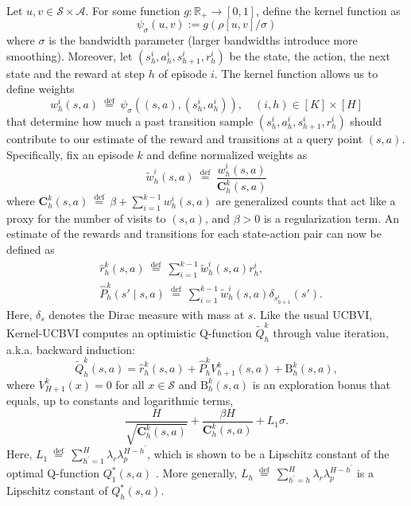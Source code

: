 \documentclass{article}
\numberwithin{equation}{section}
\newcommand{\cS}{\mathcal{S}}
\begin{document}
Let $u, v \in \cS \times \mathcal{A}$. For some function $g: \mathbb{R}_{+} \rightarrow[0,1]$, define the kernel function as
$$
\psi_\sigma(u, v) := g(\rho[u, v] / \sigma)
$$
where $\sigma$ is the bandwidth parameter (larger bandwidths introduce more smoothing).
Moreover, let \( (s_h^i, a_h^i, s_{h+1}^i, r_h^i) \) be the state, the action, the next state and the reward at step \(h\) of episode \( i \).
The kernel function allows us to define weights
\[
    w_h^i(s, a) \stackrel{\text { def }}{=} \psi_\sigma\left((s, a),\left(s_h^i, a_h^i\right)\right),\quad (i, h) \in[K] \times[H]
\]
that determine how much a past transition sample \( (s_h^i, a_h^i, s_{h+1}^i, r_h^i) \) should contribute to our estimate of the reward and transitions at a query point \((s, a)\). Specifically, fix an episode \(k\) and define normalized weights as
$$
    \widetilde{w}_h^i(s, a) \stackrel{\text { def }}{=} \frac{w_h^i(s, a)}{\mathbf{C}_h^k(s, a)}
$$
where
$\mathbf{C}_h^k(s, a) \stackrel{\text { def }}{=} \beta+\sum_{i=1}^{k-1} w_h^i(s, a)$ are generalized counts that act like a proxy for the number of visits to $(s, a)$, and $\beta>0$ is a regularization term.
An estimate of the rewards and transitions for each state-action pair can now be defined as
\begin{align*}
    & \widehat{r}_h^k(s, a) \stackrel{\text { def }}{=} \sum_{i=1}^{k-1} \widetilde{w}_h^i(s, a) r_h^i, \\
    & \widehat{P}_h^k(s' \mid s, a) \stackrel{\text { def }}{=} \sum_{i=1}^{k-1} \widetilde{w}_h^i(s, a) \delta_{s_{h+1}^i}(s').
\end{align*}
Here, $\delta_s$ denotes the Dirac measure with mass at $s$.
Like the usual UCBVI, Kernel-UCBVI computes an optimistic Q-function $\widetilde{Q}_h^k$ through value iteration, a.k.a. backward induction:
$$
\widetilde{Q}_h^k(s, a)=\widehat{r}_h^k(s, a)+\widehat{P}_h^k V_{h+1}^k(s, a)+\mathrm{B}_h^k(s, a),
$$
where $V_{H+1}^k(x)=0$ for all $x \in \cS$ and $\mathrm{B}_h^k(s, a)$ is an exploration bonus that equals, up to constants and logarithmic terms,
$$
\frac{H}{\sqrt{\mathbf{C}_h^k(s, a)}}+\frac{\beta H}{\mathbf{C}_h^k(s, a)}+L_1 \sigma.
$$
Here, $L_1 \stackrel{\text { def }}{=} \sum_{h^{\prime}=1}^H \lambda_r \lambda_p^{H-h^{\prime}}$, which is shown to be a Lipschitz constant of the optimal Q-function \( Q^*_1(s, a) \) \citep{domingues2021kernel}. More generally, $L_h \stackrel{\text { def }}{=} \sum_{h^{\prime}=h}^H \lambda_r \lambda_p^{H-h^{\prime}}$ is a Lipschitz constant of \( Q^*_h(s, a) \).
\end{document}
